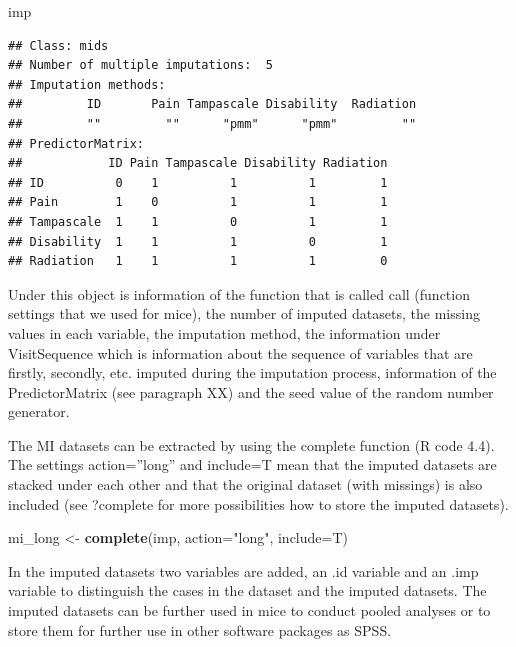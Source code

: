 \documentclass[]{book}
\newenvironment{Shaded}{\begin{snugshade}}{\end{snugshade}}
\newcommand{\KeywordTok}[1]{\textcolor[rgb]{0.13,0.29,0.53}{\textbf{#1}}}
\newcommand{\DataTypeTok}[1]{\textcolor[rgb]{0.13,0.29,0.53}{#1}}
\newcommand{\StringTok}[1]{\textcolor[rgb]{0.31,0.60,0.02}{#1}}
\newcommand{\NormalTok}[1]{#1}
\begin{document}
\begin{Shaded}
\begin{Highlighting}[]
\NormalTok{imp}
\end{Highlighting}
\end{Shaded}

\begin{verbatim}
## Class: mids
## Number of multiple imputations:  5 
## Imputation methods:
##         ID       Pain Tampascale Disability  Radiation 
##         ""         ""      "pmm"      "pmm"         "" 
## PredictorMatrix:
##            ID Pain Tampascale Disability Radiation
## ID          0    1          1          1         1
## Pain        1    0          1          1         1
## Tampascale  1    1          0          1         1
## Disability  1    1          1          0         1
## Radiation   1    1          1          1         0
\end{verbatim}

Under this object is information of the function that is called call
(function settings that we used for mice), the number of imputed
datasets, the missing values in each variable, the imputation method,
the information under VisitSequence which is information about the
sequence of variables that are firstly, secondly, etc. imputed during
the imputation process, information of the PredictorMatrix (see
paragraph XX) and the seed value of the random number generator.

The MI datasets can be extracted by using the complete function (R code
4.4). The settings action=''long'' and include=T mean that the imputed
datasets are stacked under each other and that the original dataset
(with missings) is also included (see ?complete for more possibilities
how to store the imputed datasets).

\begin{Shaded}
\begin{Highlighting}[]
\NormalTok{mi_long <-}\StringTok{ }\KeywordTok{complete}\NormalTok{(imp, }\DataTypeTok{action=}\StringTok{"long"}\NormalTok{, }\DataTypeTok{include=}\NormalTok{T)}
\end{Highlighting}
\end{Shaded}

In the imputed datasets two variables are added, an .id variable and an
.imp variable to distinguish the cases in the dataset and the imputed
datasets. The imputed datasets can be further used in mice to conduct
pooled analyses or to store them for further use in other software
packages as SPSS.
\end{document}

